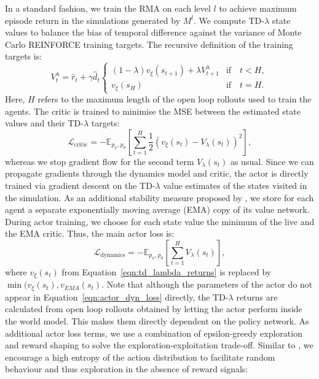 \documentclass{article}
\begin{document}
In a standard fashion, we train the RMA on each level $l$ to achieve maximum episode return in the simulations generated by $M^l$. We compute TD-$\lambda$ state values \citep{sutton2018reinforcement} to balance the bias of temporal difference against the variance of Monte Carlo REINFORCE \citep{williams2004simple} training targets. The recursive definition of the training targets is:
\begin{equation}\label{eqn:td_lambda_returns}
    V_t^\lambda = \hat{r}_t + \gamma \hat{d}_t
    \begin{cases}
        (1 - \lambda) v_\xi(s_{t+1}) + \lambda V_{t+1}^\lambda & \text{if} \quad t < H, \\
        v_\xi(s_{H}) & \text{if} \quad t = H.
    \end{cases}
\end{equation}            
Here, $H$ refers to the maximum length of the open loop rollouts used to train the agents. The critic is trained to minimise the MSE between the estimated state values and their TD-$\lambda$ targets:
\begin{equation}\label{eqn:critic_loss}
    \mathcal{L}_{\text{critic}} = - \mathbb{E}_{p_\psi, p_\theta} \left[ \sum_{t=1}^{H}\frac{1}{2} (v_\xi(s_t) - V_\lambda(s_t))^2 \right],
\end{equation}
whereas we stop gradient flow for the second term $V_\lambda(s_t)$ as usual. Since we can propagate gradients through the dynamics model and critic, the actor is directly trained via gradient descent on the TD-$\lambda$ value estimates of the states visited in the simulation. As an additional stability measure proposed by \citet{hafner2020dream}, we store for each agent a separate exponentially moving average (EMA) copy of its value network. During actor training, we choose for each state value the minimum of the live and the EMA critic. Thus, the main actor loss is:
\begin{equation}\label{eqn:actor_dyn_loss}
    \mathcal{L}_{\text{dynamics}} = - \mathbb{E}_{p_\psi, p_\theta} \left[ \sum_{t=1}^{H} V_\lambda(s_t) \right],
\end{equation}
where $v_\xi(s_t)$ from Equation~\ref{eqn:td_lambda_returns} is replaced by $\min(v_\xi(s_t), v_{EMA}(s_t)$. Note that although the parameters of the actor do not appear in Equation~\ref{eqn:actor_dyn_loss} directly, the TD-$\lambda$ returns are calculated from open loop rollouts obtained by letting the actor perform inside the world model. This makes them directly dependent on the policy network. As additional actor loss terms, we use a combination of epsilon-greedy exploration and reward shaping to solve the exploration-exploitation trade-off. Similar to \citet{haarnoja2018soft}, we encourage a high entropy of the action distribution to facilitate random behaviour and thus exploration in the absence of reward signals:
\end{document}

